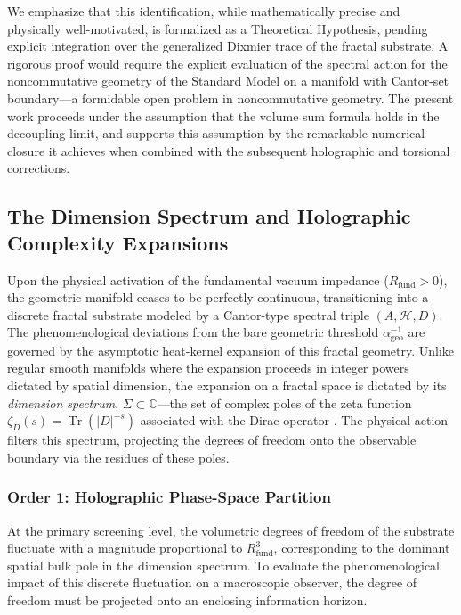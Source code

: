 \documentclass[12pt,a4paper]{article}
\begin{document}
We emphasize that this identification, while mathematically precise and physically well-motivated, is formalized as a Theoretical Hypothesis, pending explicit integration over the generalized Dixmier trace of the fractal substrate. A rigorous proof would require the explicit evaluation of the spectral action for the noncommutative geometry of the Standard Model on a manifold with Cantor-set boundary---a formidable open problem in noncommutative geometry. The present work proceeds under the assumption that the volume sum formula holds in the decoupling limit, and supports this assumption by the remarkable numerical closure it achieves when combined with the subsequent holographic and torsional corrections.

\subsection{The Dimension Spectrum and Holographic Complexity Expansions}

Upon the physical activation of the fundamental vacuum impedance ($R_{\text{fund}} > 0$), the geometric manifold ceases to be perfectly continuous, transitioning into a discrete fractal substrate modeled by a Cantor-type spectral triple $(A, \mathcal{H}, D)$. The phenomenological deviations from the bare geometric threshold $\alpha^{-1}_{\text{geo}}$ are governed by the asymptotic heat-kernel expansion of this fractal geometry. Unlike regular smooth manifolds where the expansion proceeds in integer powers dictated by spatial dimension, the expansion on a fractal space is dictated by its \textit{dimension spectrum}, $\Sigma \subset \mathbb{C}$—the set of complex poles of the zeta function $\zeta_D(s) = \operatorname{Tr}(|D|^{-s})$ associated with the Dirac operator \cite{lapidus2006, marcolli2011}. The physical action filters this spectrum, projecting the degrees of freedom onto the observable boundary via the residues of these poles.

\subsubsection{Order 1: Holographic Phase-Space Partition}
At the primary screening level, the volumetric degrees of freedom of the substrate fluctuate with a magnitude proportional to $R_{\text{fund}}^3$, corresponding to the dominant spatial bulk pole in the dimension spectrum. To evaluate the phenomenological impact of this discrete fluctuation on a macroscopic observer, the degree of freedom must be projected onto an enclosing information horizon.
\end{document}
